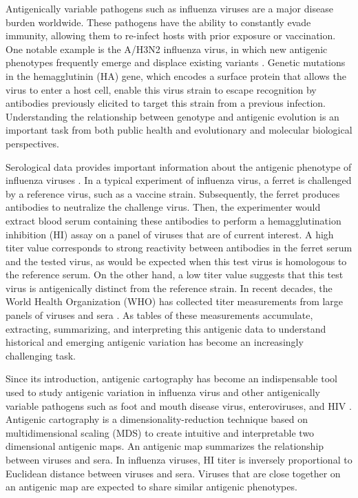 \documentclass[11pt,oneside,letterpaper]{article}
\begin{document}
Antigenically variable pathogens such as influenza viruses are a major disease burden worldwide. 
These pathogens have the ability to constantly evade immunity, allowing them to re-infect hosts with prior exposure or vaccination. 
One notable example is the A/H3N2 influenza virus, in which new antigenic phenotypes frequently emerge and displace existing variants \cite{smith_mapping_2004, bedford_integrating_2014}.
Genetic mutations in the hemagglutinin (HA) gene, which encodes a surface protein that allows the virus to enter a host cell, enable this virus strain to escape recognition by antibodies previously elicited to target this strain from a previous infection. 
Understanding the relationship between genotype and antigenic evolution is an important task from both public health and evolutionary and molecular biological perspectives.

Serological data provides important information about the antigenic phenotype of influenza viruses \cite{smith_mapping_2004}. 
In a typical experiment of influenza virus, a ferret is challenged by a reference virus, such as a vaccine strain.
Subsequently, the ferret produces antibodies to neutralize the challenge virus. 
Then, the experimenter would extract blood serum containing these antibodies to perform a hemagglutination inhibition (HI) assay  on a panel of viruses that are of current interest. 
A high titer value corresponds to strong reactivity between antibodies in the ferret serum and the tested virus, as would be expected when this test virus is homologous to the reference serum.
On the other hand, a low titer value suggests that this test virus is antigenically distinct from the reference strain. 
In recent decades, the World Health Organization (WHO) has collected titer measurements from large panels of viruses and sera \cite{smith_mapping_2004, russell_global_2008}. 
As tables of these measurements accumulate, extracting, summarizing, and interpreting this antigenic data to understand historical and emerging antigenic variation has become an increasingly challenging task. %

Since its introduction, antigenic cartography \cite{smith_mapping_2004, cai_computational_2010} has become an indispensable tool used to study antigenic variation in influenza virus and other antigenically variable pathogens such as foot and mouth disease virus, enteroviruses, and HIV \cite{smith_mapping_2004, jong_antigenic_2007, ludi_antigenic_2014, debbink_withinhost_2014, frost_mapping_2013}.
Antigenic cartography is a dimensionality-reduction technique based on multidimensional scaling (MDS) to create intuitive and interpretable two
dimensional antigenic maps. 
An antigenic map summarizes the relationship between viruses and sera.
In influenza viruses, HI titer is inversely proportional to Euclidean distance between viruses and sera.
Viruses that are close together on an antigenic map are expected to share similar antigenic phenotypes. 
\end{document}

